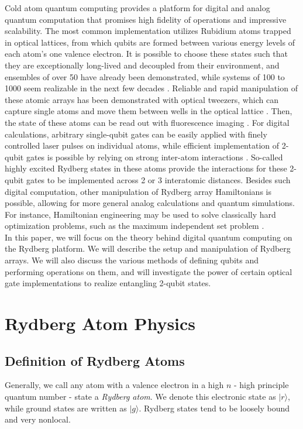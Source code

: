 \documentclass[aps,twocolumn,preprintnumbers]{revtex4}
\newcommand{\ket}[1]{|#1\rangle}
\begin{document}
Cold atom quantum computing provides a platform for digital and analog quantum computation that promises high fidelity of operations and impressive scalability. The most common implementation utilizes Rubidium atoms trapped in optical lattices, from which qubits are formed between various energy levels of each atom's one valence electron. It is possible to choose these states such that they are exceptionally long-lived and decoupled from their environment, and ensembles of over 50 have already been demonstrated, while systems of 100 to 1000 seem realizable in the next few decades \cite{summary}. 
Reliable and rapid manipulation of these atomic arrays has been demonstrated with optical tweezers, which can capture single atoms and move them between wells in the optical lattice \cite{measure}. Then, the state of these atoms can be read out with fluorescence imaging \cite{measure}. For digital calculations, arbitrary single-qubit gates can be easily applied with finely controlled laser pulses on individual atoms, while efficient implementation of 2-qubit gates is possible by relying on strong inter-atom interactions \cite{gates}. So-called highly excited Rydberg states in these atoms provide the interactions for these 2-qubit gates to be implemented across 2 or 3 interatomic distances. Besides such digital computation, other manipulation of Rydberg array Hamiltonians is possible, allowing for more general analog calculations and quantum simulations. For instance, Hamiltonian engineering may be used to solve classically hard optimization problems, such as the maximum independent set problem \cite{maxset}. \\
In this paper, we will focus on the theory behind digital quantum computing on the Rydberg platform. We will describe the setup and manipulation of Rydberg arrays. We will also discuss the various methods of defining qubits and performing operations on them, and will investigate the power of certain optical gate implementations to realize entangling 2-qubit states.

\section{Rydberg Atom Physics}

\subsection{Definition of Rydberg Atoms}
Generally, we call any atom with a valence electron in a high $n$ - high principle quantum number - state a \textit{Rydberg atom}. We denote this electronic state as $\ket{r}$, while ground states are written as $\ket{g}$. Rydberg states tend to be loosely bound and very nonlocal.
\end{document}
